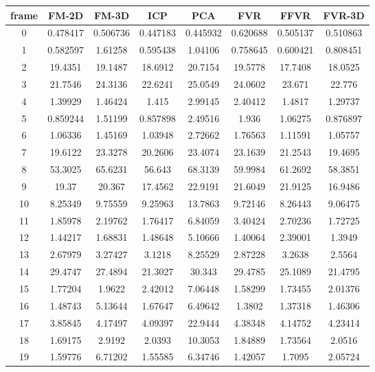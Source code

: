 \begin{figure}
\centering
\begin{tabular}{cccccccc}
\hline
\textbf{frame} & \textbf{FM-2D} & \textbf{FM-3D} & \textbf{ICP} & \textbf{PCA} & \textbf{FVR} & \textbf{FFVR} & \textbf{FVR-3D}
\\ \hline
0 & 0.478417 & 0.506736 & 0.447183 & 0.445932 & 0.620688 & 0.505137 & 0.510863\\
1 & 0.582597 & 1.61258 & 0.595438 & 1.04106 & 0.758645 & 0.600421 & 0.808451\\
2 & 19.4351 & 19.1487 & 18.6912 & 20.7154 & 19.5778 & 17.7408 & 18.0525\\
3 & 21.7546 & 24.3136 & 22.6241 & 25.0549 & 24.0602 & 23.671 & 22.776\\
4 & 1.39929 & 1.46424 & 1.415 & 2.99145 & 2.40412 & 1.4817 & 1.29737\\
5 & 0.859244 & 1.51199 & 0.857898 & 2.49516 & 1.936 & 1.06275 & 0.876897\\
6 & 1.06336 & 1.45169 & 1.03948 & 2.72662 & 1.76563 & 1.11591 & 1.05757\\
7 & 19.6122 & 23.3278 & 20.2606 & 23.4074 & 23.1639 & 21.2543 & 19.4695\\
8 & 53.3025 & 65.6231 & 56.643 & 68.3139 & 59.9984 & 61.2692 & 58.3851\\
9 & 19.37 & 20.367 & 17.4562 & 22.9191 & 21.6049 & 21.9125 & 16.9486\\
10 & 8.25349 & 9.75559 & 9.25963 & 13.7863 & 9.72146 & 8.26443 & 9.06475\\
11 & 1.85978 & 2.19762 & 1.76417 & 6.84059 & 3.40424 & 2.70236 & 1.72725\\
12 & 1.44217 & 1.68831 & 1.48648 & 5.10666 & 1.40064 & 2.39001 & 1.3949\\
13 & 2.67979 & 3.27427 & 3.1218 & 8.25529 & 2.87228 & 3.2638 & 2.5564\\
14 & 29.4747 & 27.4894 & 21.3027 & 30.343 & 29.4785 & 25.1089 & 21.4795\\
15 & 1.77204 & 1.9622 & 2.42012 & 7.06448 & 1.58299 & 1.73455 & 2.01376\\
16 & 1.48743 & 5.13644 & 1.67647 & 6.49642 & 1.3802 & 1.37318 & 1.46306\\
17 & 3.85845 & 4.17497 & 4.09397 & 22.9444 & 4.38348 & 4.14752 & 4.23414\\
18 & 1.69175 & 2.9192 & 2.0393 & 10.3053 & 1.84889 & 1.73564 & 2.0516\\
19 & 1.59776 & 6.71202 & 1.55585 & 6.34746 & 1.42057 & 1.7095 & 2.05724\\

\end{tabular}
\end{figure}
